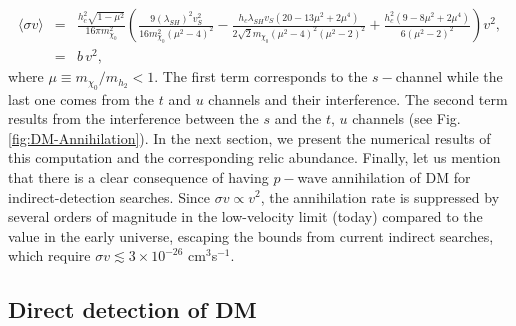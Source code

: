 \documentclass[12pt,letterpaper]{article}
\begin{document}
\begin{eqnarray}
\langle\sigma v\rangle &=& \frac{ h_c^2\sqrt{1-\mu^2}}{16 \pi m_{\chi_0}^2}\left( \frac{9 (\lambda_{SH})^2 v_S^2}{16 m_{\chi_0}^2(\mu^2-4)^2}-\frac{ h_c \lambda_{SH} v_S (20-13\mu^2+2\mu^4)}{2\sqrt{2} m_{\chi_0}(\mu^2-4)^2(\mu^2-2)^2}  +\frac{h_c^2 (9-8\mu^2+2\mu^4)}{6 (\mu^2-2)^2}\right) v^2, \nonumber \\
 &=& b \,v^2,
\end{eqnarray}
where $\mu \equiv m_{\chi_0} / m_{h_2} < 1$. The first term corresponds to the $s-$channel while the last one comes from the $t$ and $u$ channels and their interference. The second term results from the interference between the $s$ and the $t,\,u$ channels (see Fig. \ref{fig:DM-Annihilation}). In the next section, we present the numerical results of this computation and the corresponding relic abundance. Finally, let us mention that there is a clear consequence of having $p-$wave annihilation of DM for indirect-detection searches. Since $\sigma v \propto v^2$, the annihilation rate is suppressed by several orders of magnitude in the low-velocity limit (today) compared to the value in the early universe, escaping the bounds from current indirect searches, which require $\sigma v \lesssim 3\times 10^{-26}$ cm$^{3}$s$^{-1}$.
 

\subsection{Direct detection of DM}
\label{{sec:DD}}
\end{document}

